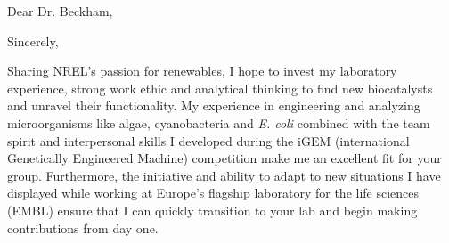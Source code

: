 \documentclass[11pt,a4paper,sans]{moderncv}
\begin{document}
\vspace*{-10mm}
\date{\today}
\opening{Dear Dr.  Beckham,}
\closing{Sincerely,\vspace{-2mm}}
\makelettertitle
\begin{spacing}{1.15}

\vspace*{-3mm}
Sharing NREL's passion for renewables, I hope to invest my laboratory experience, strong work ethic and analytical thinking to find new biocatalysts and unravel their functionality.
My experience in engineering and analyzing microorganisms like algae, cyanobacteria and \textit{E. coli} combined with the team spirit and interpersonal skills I developed during the iGEM (international Genetically Engineered Machine) competition make me an excellent fit for your group. 
Furthermore, the initiative and ability to adapt to new situations I have displayed while working at Europe's flagship laboratory for the life sciences (EMBL) ensure that I can quickly transition to your lab and begin making contributions from day one.\par%


\end{spacing}
\end{document}
